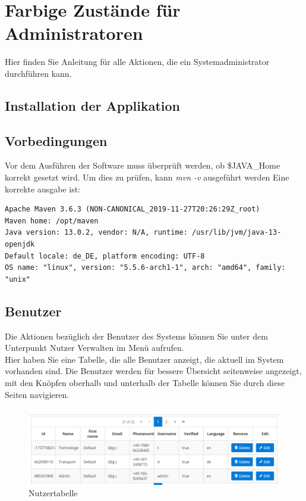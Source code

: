 \documentclass[enabledeprecatedfontcommands,fontsize=12pt,paper=a4,twoside]{scrartcl}
\begin{document}

\newpage
\section{Farbige Zustände für Administratoren}
Hier finden Sie Anleitung für alle Aktionen, die ein Systemadministrator durchführen kann. 
\subsection{Installation der Applikation}
\subsection{Vorbedingungen}
Vor dem Ausführen der Software muss überprüft werden, ob \$JAVA\_Home korrekt gesetzt wird.
Um dies zu prüfen, kann \textit{mvn -v} ausgeführt werden
Eine korrekte ausgabe ist:
\begin{verbatim}
Apache Maven 3.6.3 (NON-CANONICAL_2019-11-27T20:26:29Z_root)
Maven home: /opt/maven
Java version: 13.0.2, vendor: N/A, runtime: /usr/lib/jvm/java-13-openjdk
Default locale: de_DE, platform encoding: UTF-8
OS name: "linux", version: "5.5.6-arch1-1", arch: "amd64", family: "unix"
\end{verbatim}

\subsection{Benutzer}
Die Aktionen bezüglich der Benutzer des Systems können Sie unter dem Unterpunkt Nutzer Verwalten im Menü aufrufen. \\

Hier haben Sie eine Tabelle, die alle Benutzer anzeigt, die aktuell im System vorhanden sind. Die Benutzer werden für bessere Übersicht seitenweise angezeigt, mit den Knöpfen oberhalb und unterhalb der Tabelle können Sie durch diese Seiten navigieren.\\

\begin{figure}[h!]
\begin{center}
 \includegraphics[width=\textwidth]{screenshots/admin/nutzertabelle.png}
  \caption{Nutzertabelle}
  \label{fig:boat1}
\end{center}
\end{figure}
\end{document}

